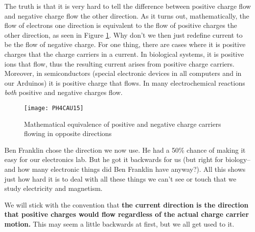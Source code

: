 The truth is that it is very hard to tell the difference between positive
charge flow and negative charge flow the other direction. 
As it turns out, mathematically, the flow of electrons one direction is
equivalent to the flow of positive charges the other direction, as seen
in Figure \ref{fig:charge_current}.
Why don't we then just redefine current to be the flow of negative charge.
For one thing, there are cases where it is positive charges that the charge
carriers in a current. In biological systems, 
it is positive ions that flow, thus the resulting current arises from
positive charge carriers.
Moreover, in semiconductors (special electronic devices in
all computers and in our Arduinos) it is positive charge that flows.
In many electrochemical reactions \emph{both} positive and negative charges
flow. 
\begin{figure}[htbp!]
\centering
\texttt{[image: PH4CAU15]}
\caption[Mathematical equivalence of positive and negative charge carriers]
{Mathematical equivalence of positive and negative charge carriers flowing
in opposite directions}
\label{fig:charge_current}
\end{figure}

Ben Franklin chose the direction we now use. He had a 50\% chance of making
it easy for our electronics lab. But he got it backwards for us (but right
for biology--and how many electronic things did Ben Franklin have anyway?).
All this shows just how hard it is to deal with all these things we can't
see or touch that we study electricity and magnetism.


We will stick with the
convention that \textbf{the current direction is the direction that positive
charges would flow regardless of the actual charge carrier motion.}
This may seem a little backwards at first, but we all get used to it.

